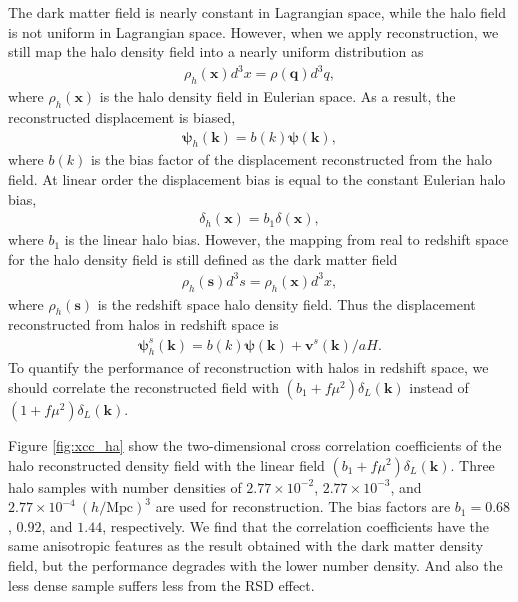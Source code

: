 \documentclass[aps,prd,twocolumn,superscriptaddress,groupedaddress,nofootinbib,amsfont]{revtex4}  %
\newcommand{\mr}{\mathrm}
\newcommand{\bea}{\begin{eqnarray}}
\newcommand{\eea}{\end{eqnarray}}
\newcommand{\bmp}{\bm{\psi}}
\newcommand{\bmv}{\bm{v}}
\newcommand{\bmk}{\bm{k}}
\newcommand{\bmx}{\bm{x}}
\newcommand{\bms}{\bm{s}}
\newcommand{\bmq}{\bm{q}}
\begin{document}
The dark matter field is nearly constant in Lagrangian space, while the halo 
field is not uniform in Lagrangian space. 
However, when we apply reconstruction,
we still map the halo density field into a nearly uniform distribution as
\bea
\rho_h(\bmx)d^3x=\rho(\bmq)d^3q,
\eea
where $\rho_h(\bmx)$ is the halo density field in Eulerian space. As a result,
the reconstructed displacement is biased,
\bea
\bmp_h(\bmk)=b(k)\bmp(\bmk),
\eea
where $b(k)$ is the bias factor of the displacement reconstructed from the 
halo field. At linear order the displacement bias is equal to the constant 
Eulerian halo bias,
\bea
\delta_h(\bmx)=b_1\delta(\bmx),
\eea
where $b_1$ is the linear halo bias. However, the mapping from real to redshift
space for the halo density field is still defined as the dark matter field
\bea
\rho_h(\bms)d^3s=\rho_h(\bmx)d^3x,
\eea
where $\rho_h(\bms)$ is the redshift space halo density field. 
Thus the displacement reconstructed from halos in redshift space is 
\bea
\bmp^s_h(\bmk)=b(k)\bmp(\bmk)+{\bmv^s(\bmk)}/{aH}.
\eea
To quantify the performance of reconstruction with halos in redshift space,
we should correlate the reconstructed field with $(b_1+f\mu^2)\delta_L(\bmk)$
instead of $(1+f\mu^2)\delta_L(\bmk)$.

Figure \ref{fig:xcc_ha} show the two-dimensional cross correlation coefficients 
of the halo reconstructed density field with the linear field $(b_1+f\mu^2)\delta_L(\bmk)$.
Three halo samples with number densities of $2.77\times10^{-2}$, $2.77\times10^{-3}$, and $2.77\times10^{-4}\ (h/\mr{Mpc})^3$ are used for reconstruction.
The bias factors are $b_1=0.68$, $0.92$, and $1.44$, respectively.
We find that the correlation coefficients have the same anisotropic features 
as the result obtained with the dark matter density field, but the performance 
degrades with the lower number density. And also the less dense sample suffers
less from the RSD effect.
\end{document}
